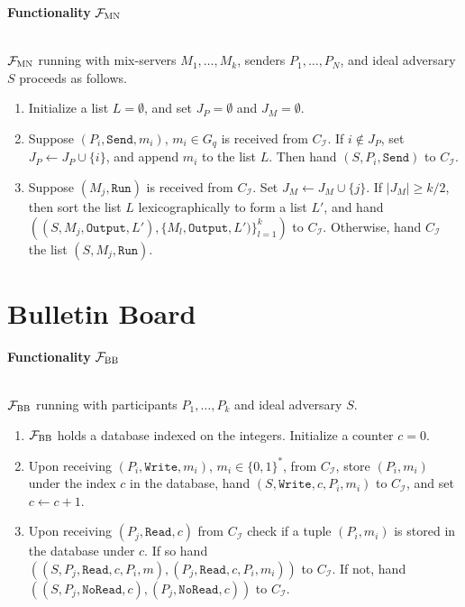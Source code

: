 \documentclass[a4paper]{article}
\newcommand{\F}{\mathcal{F}}
\begin{document}
\begin{framed}
    \centerline{\textbf{Functionality} $\F_{\textsc{MN}}$}
    \ \\
    \noindent $\F_{\textsc{MN}}$ running with mix-servers $M_1, \ldots, M_k$, senders $P_1, \ldots, P_N$, and ideal adversary $S$ proceeds as follows.
    
    \begin{enumerate}
        \item Initialize a list $L = \emptyset$, and set $J_P = \emptyset$ and $J_M = \emptyset$.
        \item Suppose $(P_i, \texttt{Send}, m_i)$, $m_i \in G_q$ is received from $C_\mathcal{I}$. If $i \not \in J_P$, set $J_P \leftarrow J_P \cup \{i\}$, and append $m_i$ to the list $L$. Then hand $(S, P_i, \texttt{Send})$ to $C_\mathcal{I}$.
        \item Suppose $(M_j, \texttt{Run})$ is received from $C_\mathcal{I}$. Set $J_M \leftarrow J_M \cup \{j\}$. If $|J_M| \geq k/2$, then sort the list $L$ lexicographically to form a list $L'$, and hand $((S, M_j, \texttt{Output}, L'), {\{M_l, \texttt{Output}, L')\}}^{k}_{l=1})$ to $C_\mathcal{I}$. Otherwise, hand $C_\mathcal{I}$ the list $(S, M_j, \texttt{Run})$.
    \end{enumerate}
\end{framed}



\section{Bulletin Board~\cite{wikstrom2004universally}}

\begin{framed}
    \centerline{\textbf{Functionality} $\F_{\textsc{BB}}$}
    \ \\
    \noindent $\F_{\textsc{BB}}$ running with participants $P_1, \ldots, P_k$ and ideal adversary $S$.
    
    \begin{enumerate}
        \item $\F_{\textsc{BB}}$ holds a database indexed on the integers. Initialize a counter $c = 0$.
        \item Upon receiving $(P_i, \texttt{Write}, m_i)$, $m_i \in {\{0, 1\}}^*$, from $C_\mathcal{I}$, store $(P_i, m_i)$ under the index $c$ in the database, hand $(S, \texttt{Write}, c, P_i, m_i)$ to $C_\mathcal{I}$, and set $c \leftarrow c + 1$.
        \item Upon receiving $(P_j, \texttt{Read}, c)$ from $C_\mathcal{I}$ check if a tuple $(P_i, m_i)$ is stored in the database under $c$. If so hand $((S, P_j, \texttt{Read}, c, P_i, m),(P_j, \texttt{Read}, c, P_i, m_i))$ to $C_\mathcal{I}$. If not, hand $((S, P_j, \texttt{NoRead},c), (P_j, \texttt{NoRead}, c))$ to $C_\mathcal{I}$.
    \end{enumerate}
\end{framed}
\end{document}
